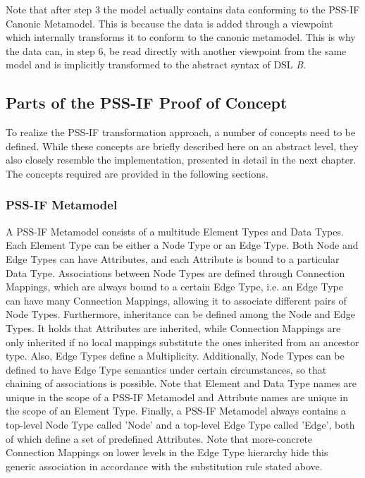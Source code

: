 Note that after step 3 the model actually contains data conforming to the PSS-IF Canonic Metamodel. This is because the data is added through a viewpoint which internally transforms it to conform to the canonic metamodel. This is why the data can, in step 6, be read directly with another viewpoint from the same model and is implicitly transformed to the abstract syntax of DSL \textit{B}.

\subsection{Parts of the PSS-IF Proof of Concept}

To realize the PSS-IF transformation approach, a number of concepts need to be defined. While these concepts are briefly described here on an abstract level, they also closely resemble the implementation, presented in detail in the next chapter. The concepts required are provided in the following sections.

\subsubsection{PSS-IF Metamodel}

A PSS-IF Metamodel consists of a multitude Element Types and Data Types. Each Element Type can be either a Node Type or an Edge Type. Both Node and Edge Types can have Attributes, and each Attribute is bound to a particular Data Type. Associations between Node Types are defined through Connection Mappings, which are always bound to a certain Edge Type, i.e. an Edge Type can have many Connection Mappings, allowing it to associate different pairs of Node Types. Furthermore, inheritance can be defined among the Node and Edge Types. It holds that Attributes are inherited, while Connection Mappings are only inherited if no local mappings substitute the ones inherited from an ancestor type. Also, Edge Types define a Multiplicity. Additionally, Node Types can be defined to have Edge Type semantics under certain circumstances, so that chaining of associations is possible. Note that Element and Data Type names are unique in the scope of a PSS-IF Metamodel and Attribute names are unique in the scope of an Element Type. Finally, a PSS-IF Metamodel always contains a top-level Node Type called 'Node' and a top-level Edge Type called 'Edge', both of which define a set of predefined Attributes. Note that more-concrete Connection Mappings on lower levels in the Edge Type hierarchy hide this generic association in accordance with the substitution rule stated above.

